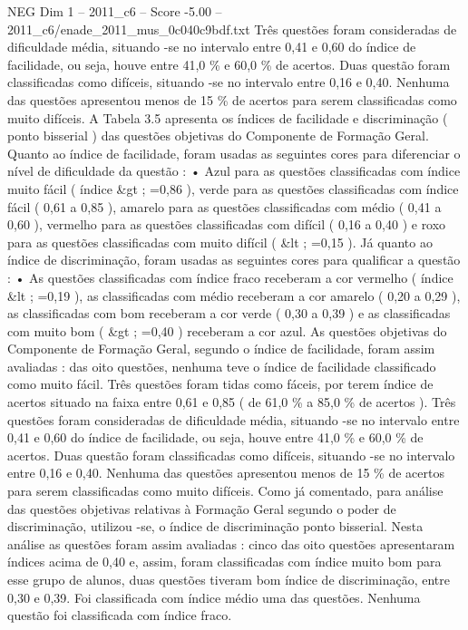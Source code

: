 \begin{textsample}{NEG Dim 1 – 2011\_c6 – Score -5.00 – 2011\_c6/enade\_2011\_mus\_0c040c9bdf.txt}
Três questões foram consideradas de dificuldade média, situando -se no intervalo entre 0,41 e 0,60 do índice de facilidade, ou seja, houve entre 41,0 \% e 60,0 \% de acertos.
Duas questão foram classificadas como difíceis, situando -se no intervalo entre 0,16 e 0,40.
Nenhuma das questões apresentou menos de 15 \% de acertos para serem classificadas como muito difíceis.
A Tabela 3.5 apresenta os índices de facilidade e discriminação ( ponto bisserial ) das questões objetivas do Componente de Formação Geral.
Quanto ao índice de facilidade, foram usadas as seguintes cores para diferenciar o nível de dificuldade da questão : • Azul para as questões classificadas com índice muito fácil ( índice \&gt ; =0,86 ), verde para as questões classificadas com índice fácil ( 0,61 a 0,85 ), amarelo para as questões classificadas com médio ( 0,41 a 0,60 ), vermelho para as questões classificadas com difícil ( 0,16 a 0,40 ) e roxo para as questões classificadas com muito difícil ( \&lt ; =0,15 ).
Já quanto ao índice de discriminação, foram usadas as seguintes cores para qualificar a questão : • As questões classificadas com índice fraco receberam a cor vermelho ( índice \&lt ; =0,19 ), as classificadas com médio receberam a cor amarelo ( 0,20 a 0,29 ), as classificadas com bom receberam a cor verde ( 0,30 a 0,39 ) e as classificadas com muito bom ( \&gt ; =0,40 ) receberam a cor azul.
As questões objetivas do Componente de Formação Geral, segundo o índice de facilidade, foram assim avaliadas : das oito questões, nenhuma teve o índice de facilidade classificado como muito fácil.
Três questões foram tidas como fáceis, por terem índice de acertos situado na faixa entre 0,61 e 0,85 ( de 61,0 \% a 85,0 \% de acertos ).
Três questões foram consideradas de dificuldade média, situando -se no intervalo entre 0,41 e 0,60 do índice de facilidade, ou seja, houve entre 41,0 \% e 60,0 \% de acertos.
Duas questão foram classificadas como difíceis, situando -se no intervalo entre 0,16 e 0,40.
Nenhuma das questões apresentou menos de 15 \% de acertos para serem classificadas como muito difíceis.
Como já comentado, para análise das questões objetivas relativas à Formação Geral segundo o poder de discriminação, utilizou -se, o índice de discriminação ponto bisserial.
Nesta análise as questões foram assim avaliadas : cinco das oito questões apresentaram índices acima de 0,40 e, assim, foram classificadas com índice muito bom para esse grupo de alunos, duas questões tiveram bom índice de discriminação, entre 0,30 e 0,39.
Foi classificada com índice médio uma das questões.
Nenhuma questão foi classificada com índice fraco.

\end{textsample}
